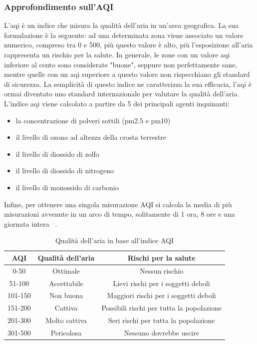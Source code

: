 \subsubsection{Approfondimento sull'AQI}
L'aqi è un indice che misura la qualità dell'aria in un'area geografica.
La sua formulazione è la seguente: ad una determinata zona viene associato un valore numerico, compreso tra 0 e 500, più questo valore è alto, più l'esposizione all'aria rappresenta un rischio per la salute.
In generale, le zone con un valore aqi inferiore al cento sono considerate "buone", seppure non perfettamente sane, mentre quelle con un aqi superiore a questo valore non rispecchiano gli standard di sicurezza.
La semplicità di questo indice ne caratterizza la sua efficacia, l'aqi è ormai diventato uno standard internazionale per valutare la qualità dell'aria.
L'indice aqi viene calcolato a partire da 5 dei principali agenti inquinanti:
\begin{itemize}
  \item{la concentrazione di polveri sottili (pm2.5 e pm10)}
  \item{il livello di ozono ad altezza della crosta terrestre}
  \item{il livello di diossido di zolfo}
  \item{il livello di diossido di nitrogeno}
  \item{il livello di monossido di carbonio}  
\end{itemize}
Infine, per ottenere una singola misurazione AQI si calcola la media di più misurazioni avvenute in un arco di tempo, solitamente di 1 ora, 8 ore e una giornata intera  ~\cite{aqibasics}.
	

\begin{table}[h]
  \centering
  \caption{Qualità dell'aria in base all'indice AQI}
  \label{tab:aqi}
  \begin{tabular}{|c|c|c|}
    \hline
    AQI & Qualità dell'aria & Rischi per la salute \\ \hline
    \rowcolor{Green} 0-50 & Ottimale & Nessun rischio \\ \hline
    \rowcolor{Yellow} 51-100 & Accettabile & Lievi rischi per i soggetti deboli \\ \hline
    \rowcolor{Orange} 101-150 & Non buona & Maggiori rischi per i soggetti deboli \\ \hline
    \rowcolor{Red} 151-200 & Cattiva & Possibili rischi per tutta la popolazione \\ \hline
    \rowcolor{Purple} 201-300 & Molto cattiva & Seri rischi per tutta la popolazione \\ \hline
    \rowcolor{Maroon} 301-500 & Pericolosa & Nessuno dovrebbe uscire \\ \hline
  \end{tabular}
\end{table}

